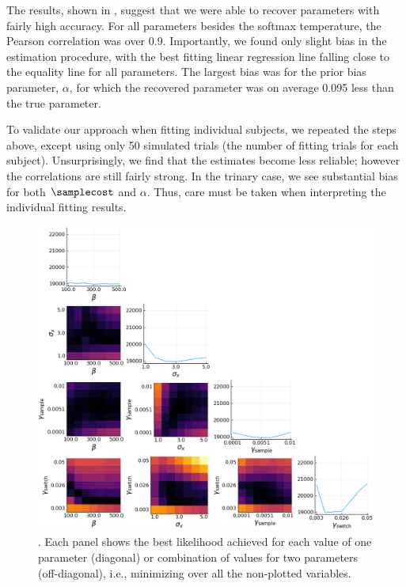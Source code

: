 
The results, shown in , suggest that we were able to recover parameters with fairly high accuracy. For all parameters besides the softmax temperature, the Pearson correlation was over 0.9. Importantly, we found only slight bias in the estimation procedure, with the best fitting linear regression line falling close to the equality line for all parameters. The largest bias was for the prior bias parameter, $\alpha$, for which the recovered parameter was on average 0.095 less than the true parameter.

To validate our approach when fitting individual subjects, we repeated the steps above, except using only 50 simulated trials (the number of fitting trials for each subject). Unsurprisingly, we find that the estimates become less reliable; however the correlations are still fairly strong. In the trinary case, we see substantial bias for both $\samplecost$ and $\alpha$. Thus, care must be taken when interpreting the individual fitting results.


\begin{figure}[hb!]
  \centering
  \includegraphics[width=\textwidth]{figs/attention/supp-grid-both.png}
  \caption{.
    Each panel shows the best likelihood achieved for each value of one parameter (diagonal) or combination of values for two parameters (off-diagonal), i.e., minimizing over all the non-plotted variables.
  }
  \label{fig:attention-grid}
\end{figure}

